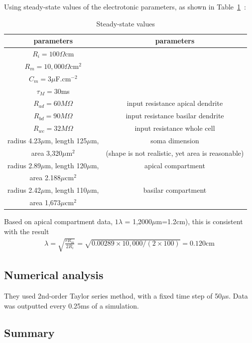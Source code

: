 Using steady-state values of the electrotonic parameters, as shown in
Table~\ref{tab:steady-state_traub}~\citep{turner1980sse}:
\begin{table}[hbt]
\begin{center}
\caption{Steady-state values}
\begin{tabular}{cc} 
  \hline
  parameters & parameters \\ 
  \hline\hline
  $R_i=100\Omega$cm & \\
  $R_m=10,000\Omega$cm$^2$ & \\
  $C_m=3\mu$F.cm$^{-2}$ & \\
  $\tau_M=30$ms & \\
  $R_{ad}=60M\Omega$ & input resistance apical dendrite\\
  $R_{bd}=90M\Omega$ & input resistance basilar dendrite\\
  $R_{wc}=32M\Omega$ & input resistance whole cell\\
  radius 4.23$\mu$m, length 125$\mu$m,  & soma
  dimension\\
  area 3,320$\mu$m$^2$  & (shape is not realistic, yet area is
  reasonable) \\
  radius 2.89$\mu$m, length 120$\mu$m,  & apical compartment
  \\  
  area 2.188$\mu$cm$^2$  & \\
  radius 2.42$\mu$m, length 110$\mu$m,  & basilar compartment
  \\  
  area 1,673$\mu$cm$^2$  & \\  
\end{tabular}
\end{center}
\label{tab:steady-state_traub}
\end{table}

Based on apical compartment data, $1\lambda$ = 1,2000$\mu$m=1.2cm),
this is consistent with the result 
\begin{eqnarray*}
  \lambda = \sqrt{\frac{rR_m}{2R_i}} =
  \sqrt{0.00289\times10,000/(2\times 100)} = 0.120 \text{cm}
\end{eqnarray*}


\subsection{Numerical analysis}
\label{sec:numerical-analysis}

They used 2nd-order Taylor series method, with a fixed time step of
50$\mu$s. Data was outputted every 0.25ms of a simulation. 

\subsection{Summary}
\label{sec:summary-1}


